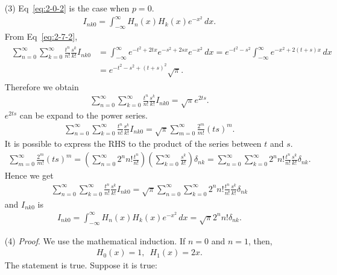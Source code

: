\documentclass[floatfix,nofootinbib,superscriptaddress,fleqn]{revtex4-2}
\begin{document}
\begin{itemize}
\item[(3)] Eq~\eqref{eq:2-0-2} is the case when $p=0$.
\begin{align}
  I_{nk0} = \int^{\infty}_{-\infty}H_n(x)H_k(x)e^{-x^2}\,dx.
\end{align}
From Eq~\eqref{eq:2-7-2},
\begin{align}
  \begin{split}
    \sum_{n=0}^\infty\sum_{k=0}^\infty \frac{t^n}{n!}\frac{s^k}{k!}
    I_{nk0}
    &= \int^{\infty}_{-\infty}e^{-t^2+2tx}e^{-s^2+2sx}e^{-x^2}\,dx
    =e^{-t^2-s^2}\int^\infty_{-\infty}e^{-x^2+2(t+s)x}\,dx  \\
    &=e^{-t^2-s^2+(t+s)^2}\sqrt{\pi}.
  \end{split}
\end{align}
Therefore we obtain
\begin{align}
  \sum_{n=0}^\infty\sum_{k=0}^\infty \frac{t^n}{n!}\frac{s^k}{k!}
    I_{nk0}
    =\sqrt{\pi}e^{2ts}.
\end{align}
$e^{2ts}$ can be expand to the power series.
\begin{align}
  \sum_{n=0}^\infty\sum_{k=0}^\infty \frac{t^n}{n!}\frac{s^k}{k!}
    I_{nk0}
    =\sqrt{\pi}\sum_{m=0}^{\infty}\frac{2^m}{m!}(ts)^m.
\end{align}
It is possible to express the RHS to the product of the series between $t$ and $s$.
\begin{align}
  \sum_{m=0}^{\infty}\frac{2^m}{m!}(ts)^m
  =\left(\sum_{n=0}^{\infty}2^n n!\frac{t^n}{n!}\right)
  \left(\sum_{k=0}^{\infty}\frac{s^k}{k!}\right)\delta_{nk}
  =\sum_{n=0}^\infty\sum_{k=0}^\infty 2^n n!\frac{t^n}{n!}\frac{s^k}{k!}\delta_{nk}.
\end{align}
Hence we get
\begin{align}
  \sum_{n=0}^\infty\sum_{k=0}^\infty \frac{t^n}{n!}\frac{s^k}{k!}
  I_{nk0}
  =\sqrt{\pi}\sum_{n=0}^\infty\sum_{k=0}^\infty 
  2^n n!\frac{t^n}{n!}\frac{s^k}{k!}\delta_{nk}
\end{align}
and $I_{nk0}$ is
\begin{align}
  I_{nk0}
  = \int^{\infty}_{-\infty}H_n(x)H_k(x)e^{-x^2}\,dx
  = \sqrt{\pi}2^n n!\delta_{nk}.
\end{align}
\item[(4)] {\it Proof}. We use the mathematical induction. 
If $n=0$ and $n=1$, then,
\begin{align}
  H_0(x) = 1,\,\,\,H_1(x)=2x. 
\end{align}
The statement is true. Suppose it is true:

\end{itemize}
\end{document}
